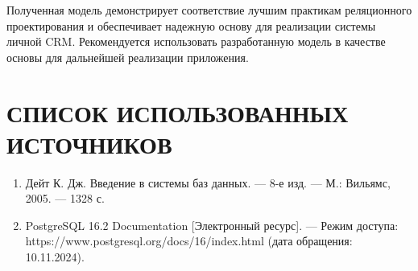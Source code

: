 \documentclass[14pt]{extarticle}
\begin{document}
Полученная модель демонстрирует соответствие лучшим практикам реляционного проектирования и обеспечивает надежную основу для реализации системы личной CRM. Рекомендуется использовать разработанную модель в качестве основы для дальнейшей реализации приложения.

\section{СПИСОК ИСПОЛЬЗОВАННЫХ ИСТОЧНИКОВ}

\begin{enumerate}
    \item Дейт К. Дж. Введение в системы баз данных. — 8-е изд. — М.: Вильямс, 2005. — 1328 с.
    \item PostgreSQL 16.2 Documentation [Электронный ресурс]. — Режим доступа: https://www.postgresql.org/docs/16/index.html (дата обращения: 10.11.2024).
\end{enumerate}
\end{document}
